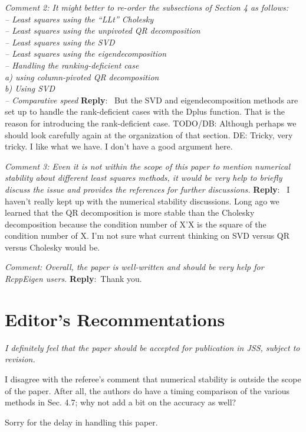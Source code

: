 \documentclass[10pt]{article}
\newcommand{\pointRaised}[2]{\smallskip %
  \textsl{{\fontseries{b}\selectfont #1}: #2}\newline}
\newcommand{\reply}[1]{\textbf{Reply}:\ #1 \smallskip } %
\begin{document}
\pointRaised{Comment 2}{
  It might better to re-order the subsections of Section 4 as follows: \\
  -- Least squares using the ``LLt'' Cholesky \\
  -- Least squares using the unpivoted QR decomposition\\
  -- Least squares using the SVD \\
  -- Least squares using the eigendecomposition \\
  -- Handling the ranking-deficient case \\
  \phantom{---} a) using column-pivoted QR decomposition \\
  \phantom{---} b) Using SVD \\
  -- Comparative speed 
}
\reply{
  But the SVD and eigendecomposition methods are set up to handle
  the rank-deficient cases with the Dplus function.  That is the
  reason for introducing the rank-deficient case. 
  TODO/DB: Although perhaps
  we should look carefully again at the organization of that section.
  DE: Tricky, very tricky.  I like what we have. I don't have a good argument
  here.
}

\pointRaised{Comment 3}{
  Even it is not within the scope of this paper to mention
  numerical stability about different least squares methods, 
  it would be very help to briefly discuss the issue and provides
  the references for further discussions. 
}
\reply{
  I haven't really kept up with the numerical stability
  discussions.  Long ago we learned that the QR decomposition is
  more stable than the Cholesky decomposition because the condition
  number of X'X is the square of the condition number of X.  I'm
  not sure what current thinking on SVD versus QR versus Cholesky
  would be.
}


\pointRaised{Comment}{
  Overall, the paper is well-written and should be very help 
  for RcppEigen users. 
}
\reply{Thank you.}


\section*{Editor's Recommentations}

{\sl 
  I definitely feel that the paper should be accepted for publication in
  JSS, subject to revision.
  
  I disagree with the referee's comment that numerical stability is
  outside the scope of the paper. After all, the authors do have a timing
  comparison of the various methods in Sec. 4.7; why not add a bit on the
  accuracy as well?
  
  Sorry for the delay in handling this paper.
}
\end{document}
